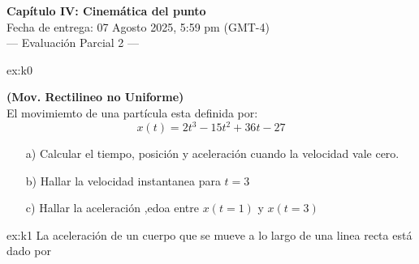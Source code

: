  \begin{multicols}{2}
     \begin{center}
         \LARGE{\textbf{Capítulo IV: Cinemática del punto}}\\	
         \vspace{0.2cm}
         \large{Fecha de entrega: 07 Agosto 2025, 5:59 pm (GMT-4)}\\
         \large{— Evaluación Parcial 2 —}
     \end{center}
     \begin{excercise}[][][a) $t_1=2 \ \mathrm{s}$, $t_2=3\ \mathrm{s}$, $x(t=2)=-23 \ \mathrm{m}$, $x(t=3)=0 \ \mathrm{m}$, $a(t=2)=-6 \ \mathrm{ms^{-2}}$, $a(t=3)=6 \ \mathrm{ms^{-2}}$ , b) $v(t=3)=18 \ \mathrm {ms^{-1}}$, c) $a=-6 \ \mathrm{ms^{-2}}$]{ex:k0}{
        \textbf{(Mov. Rectilineo no Uniforme)}\\
        El movimiemto de una partícula esta definida por:
        \begin{equation*}
            x(t)=2t^3-15t^2+36t-27
        \end{equation*}
        \begin{itemize}
            \item[a)] Calcular el tiempo, posición y aceleración cuando la velocidad vale cero.
            \item[b)] Hallar la velocidad instantanea para $t=3$
            \item[c)] Hallar la aceleración ,edoa entre $x(t=1)$ y $x(t=3)$
        \end{itemize}
         }
     \end{excercise} 
     \begin{excercise}[][][$v(t) = \displaystyle{4t-\frac{t^3}{3}-1}\ (\mathrm{ms^{-1}})$, $x(t)=\displaystyle{2t^4-\frac{t^4}{12}-t-\frac{3}{4}} \ (\mathrm{m})$]{ex:k1}{
         La aceleración de un cuerpo que se mueve a lo largo de una linea recta está dado por
         \begin{equation*}

\end{equation*}}
\end{excercise}
\end{multicols}
